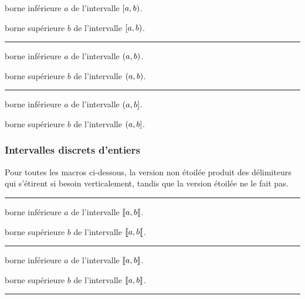 \documentclass[12pt,a4paper]{article}
\theoremstyle{definition}
\newcommand\separation{
	\medskip
	\hfill\rule{0.5\textwidth}{0.75pt}\hfill
	\medskip
}
\begin{document}
 borne inférieure $a$ de l'intervalle $\intervalCP{a}{b}$.

 borne supérieure $b$ de l'intervalle $\intervalCP{a}{b}$.


\separation




 borne inférieure $a$ de l'intervalle $\intervalP{a}{b}$.

 borne supérieure $b$ de l'intervalle $\intervalP{a}{b}$.


\separation




 borne inférieure $a$ de l'intervalle $\intervalPC{a}{b}$.

 borne supérieure $b$ de l'intervalle $\intervalPC{a}{b}$.






\subsubsection{Intervalles discrets d'entiers}

Pour toutes les macros ci-dessous, la version non étoilée produit des délimiteurs qui s'étirent si besoin verticalement, tandis que la version étoilée ne le fait pas.


\separation





 borne inférieure $a$ de l'intervalle $\ZintervalCO{a}{b}$.

 borne supérieure $b$ de l'intervalle $\ZintervalCO{a}{b}$.


\separation




 borne inférieure $a$ de l'intervalle $\ZintervalC{a}{b}$.

 borne supérieure $b$ de l'intervalle $\ZintervalC{a}{b}$.


\separation
\end{document}
